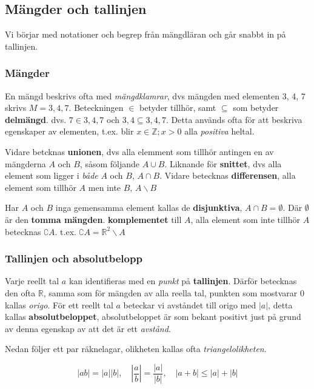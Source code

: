 \documentclass[12pt]{article} %
\begin{document}
\subsection{Mängder och tallinjen}
Vi börjar med notationer och begrep från mängdläran och går snabbt in på tallinjen.

\subsubsection{Mängder}
En mängd beskrivs ofta med \textit{mängdklamrar}, dvs mängden med elementen 3, 4, 7 skrivs $M = {3, 4, 7}$. Beteckningen $\in$ betyder tillhör, samt $\subseteq$ som betyder \textbf{delmängd}. dvs. $7 \in {3, 4, 7}$ och ${3, 4} \subseteq {3, 4, 7}$. Detta används ofta för att beskriva egenskaper av elementen, t.ex. blir ${x \in \mathbb{Z} ; x > 0}$ alla \textit{positiva} heltal.

\par Vidare betcknas \textbf{unionen}, dvs alla elemment som tillhör antingen en av mängderna $A$ och $B$, såsom följande $A \cup B$. Liknande för \textbf{snittet}, dvs alla element som ligger i \textit{både} $A$ och $B$, $A \cap B$. Vidare betecknas \textbf{differensen}, alla element som tillhör $A$ men inte $B$, $A \backslash B$

\par Har $A$ och $B$ inga gemensamma element kallas de \textbf{disjunktiva}, $A \cap B = \emptyset$. Där $\emptyset$ är den \textbf{tomma mängden}. \textbf{komplementet} till $A$, alla element som inte tillhör $A$ betecknas $\complement A$. t.ex. $\complement A = \mathbb{R}^2 \backslash A$

\subsubsection{Tallinjen och absolutbelopp}
Varje reellt tal $a$ kan identifieras med en \textit{punkt} på \textbf{tallinjen}. Därför betecknas den ofta $\mathbb{R}$, samma som för mängden av alla reella tal, punkten som mostvarar 0 kallas \textit{origo}. För ett reellt tal $a$ beteckar vi avståndet till origo med $| a |$, detta kallas \textbf{absolutbeloppet}, absolutbeloppet är som bekant positivt just på grund av denna egenskap av att det är ett \textit{avstånd}.

\par Nedan följer ett par räknelagar, olikheten kallas ofta \textit{triangelolikheten}.

\[
|ab| = |a||b|, \quad | \dfrac{a}{b} | = \dfrac{|a|}{|b|}, \quad |a + b| \leq |a| + |b|
\]
\end{document}
